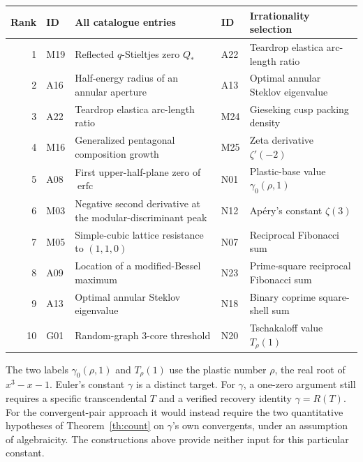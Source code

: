 \documentclass[11pt,a4paper]{article}
\begin{document}
\begin{center}
\small\setlength{\tabcolsep}{3pt}\renewcommand{\arraystretch}{1.25}
\begin{tabularx}{\linewidth}{@{}r l >{\raggedright\arraybackslash}X l >{\raggedright\arraybackslash}X@{}}
\toprule
Rank & ID & All catalogue entries & ID & Irrationality selection\\
\midrule
1 & M19 & Reflected $q$-Stieltjes zero $Q_*$ & A22 & Teardrop elastica arc-length ratio\\
2 & A16 & Half-energy radius of an annular aperture & A13 & Optimal annular Steklov eigenvalue\\
3 & A22 & Teardrop elastica arc-length ratio & M24 & Gieseking cusp packing density\\
4 & M16 & Generalized pentagonal composition growth & M25 & Zeta derivative $\zeta'(-2)$\\
5 & A08 & First upper-half-plane zero of $\operatorname{erfc}$ & N01 & Plastic-base value $\gamma_0(\rho,1)$\\
6 & M03 & Negative second derivative at the modular-discriminant peak & N12 & Ap\'ery's constant $\zeta(3)$\\
7 & M05 & Simple-cubic lattice resistance to $(1,1,0)$ & N07 & Reciprocal Fibonacci sum\\
8 & A09 & Location of a modified-Bessel maximum & N23 & Prime-square reciprocal Fibonacci sum\\
9 & A13 & Optimal annular Steklov eigenvalue & N18 & Binary coprime square-shell sum\\
10 & G01 & Random-graph $3$-core threshold & N20 & Tschakaloff value $T_\rho(1)$\\
\bottomrule
\end{tabularx}
\end{center}
The two labels $\gamma_0(\rho,1)$ and $T_\rho(1)$ use the plastic
number $\rho$, the real root of $x^3-x-1$. Euler's constant $\gamma$
is a distinct target. For $\gamma$, a one-zero argument still requires a
specific transcendental $T$ and a verified recovery identity
$\gamma=R(T)$. For the convergent-pair approach it would instead require
the two quantitative hypotheses of Theorem~\ref{th:count} on $\gamma$'s
own convergents, under an assumption of algebraicity. The constructions
above provide neither input for this particular constant.
\end{document}
